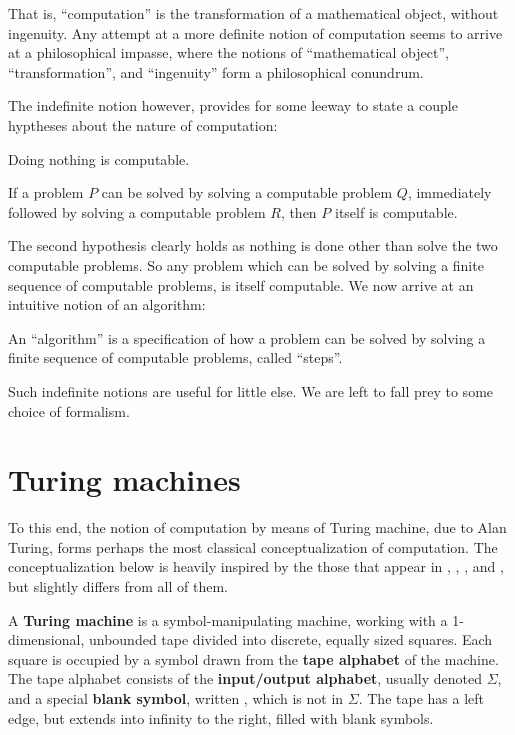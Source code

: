 That is, ``computation'' is the transformation of a mathematical object,
without ingenuity.  Any attempt at a more definite notion of computation seems
to arrive at a philosophical impasse, where the notions of ``mathematical
object'', ``transformation'', and ``ingenuity'' form a philosophical conundrum.

The indefinite notion however, provides for some leeway to state a couple
hyptheses about the nature of computation:

\begin{hypothesis} \label{ths:do-nothing} Doing nothing is computable.
\end{hypothesis}

\begin{hypothesis} \label{ths:problem-composition} If a problem $P$ can be
solved by solving a computable problem $Q$, immediately followed by solving a
computable problem $R$, then $P$ itself is computable. \end{hypothesis}

The second hypothesis clearly holds as nothing is done other than solve the two
computable problems.  So any problem which can be solved by solving a finite
sequence of computable problems, is itself computable. We now arrive at an
intuitive notion of an algorithm:

\begin{notion} \label{ntn:problem-algorithm} An ``algorithm'' is a
specification of how a problem can be solved by solving a finite sequence of
computable problems, called ``steps''.\end{notion}

Such indefinite notions are useful for little else. We are left to fall prey to
some choice of formalism.

\section{Turing machines}

To this end, the notion of computation by means of Turing machine, due to Alan
Turing\cite{turing-1936-7}, forms perhaps the most classical conceptualization
of computation. The conceptualization below is heavily inspired by the those
that appear in \cite{tourlakis-1984}, \cite{jones-1997},
\cite{homer-selman-2011}, and \cite{sipser-2013}, but slightly differs from all
of them.

A \textbf{Turing machine} is a symbol-manipulating machine, working with a
1-dimensional, unbounded tape divided into discrete, equally sized squares.
Each square is occupied by a symbol drawn from the \textbf{tape alphabet} of
the machine.  The tape alphabet consists of the \textbf{input/output alphabet},
usually denoted $\Sigma$, and a special \textbf{blank symbol}, written \blank,
which is not in $\Sigma$. The tape has a left edge, but extends into infinity
to the right, filled with blank symbols.

